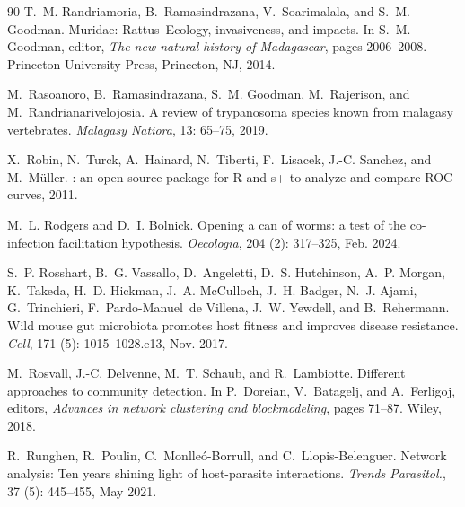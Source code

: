 \documentclass[oneside, a4paper, onecolumn, 11pt]{article}
\begin{document}
\begin{thebibliography}{90}
T.~M. Randriamoria, B.~Ramasindrazana, V.~Soarimalala, and S.~M. Goodman.
\newblock Muridae: {Rattus–Ecology}, invasiveness, and impacts.
\newblock In S.~M. Goodman, editor, \emph{The new natural history of Madagascar}, pages 2006--2008. Princeton University Press, Princeton, NJ, 2014.

M.~Rasoanoro, B.~Ramasindrazana, S.~M. Goodman, M.~Rajerison, and M.~Randrianarivelojosia.
\newblock A review of trypanosoma species known from malagasy vertebrates.
\newblock \emph{Malagasy Natiora}, 13: 65--75, 2019.

X.~Robin, N.~Turck, A.~Hainard, N.~Tiberti, F.~Lisacek, J.-C. Sanchez, and M.~Müller.
: an open-source package for {R} and s+ to analyze and compare {ROC} curves, 2011.

M.~L. Rodgers and D.~I. Bolnick.
\newblock Opening a can of worms: a test of the co-infection facilitation hypothesis.
\newblock \emph{Oecologia}, 204 (2): 317--325, Feb. 2024.

S.~P. Rosshart, B.~G. Vassallo, D.~Angeletti, D.~S. Hutchinson, A.~P. Morgan, K.~Takeda, H.~D. Hickman, J.~A. McCulloch, J.~H. Badger, N.~J. Ajami, G.~Trinchieri, F.~Pardo-Manuel~de Villena, J.~W. Yewdell, and B.~Rehermann.
\newblock Wild mouse gut microbiota promotes host fitness and improves disease resistance.
\newblock \emph{Cell}, 171 (5): 1015--1028.e13, Nov. 2017.

M.~Rosvall, J.-C. Delvenne, M.~T. Schaub, and R.~Lambiotte.
\newblock Different approaches to community detection.
\newblock In P.~Doreian, V.~Batagelj, and A.~Ferligoj, editors, \emph{Advances in network clustering and blockmodeling}, pages 71--87. Wiley, 2018.

R.~Runghen, R.~Poulin, C.~Monlleó-Borrull, and C.~Llopis-Belenguer.
\newblock Network analysis: Ten years shining light of host-parasite interactions.
\newblock \emph{Trends Parasitol.}, 37 (5): 445--455, May 2021.


\end{thebibliography}
\end{document}
